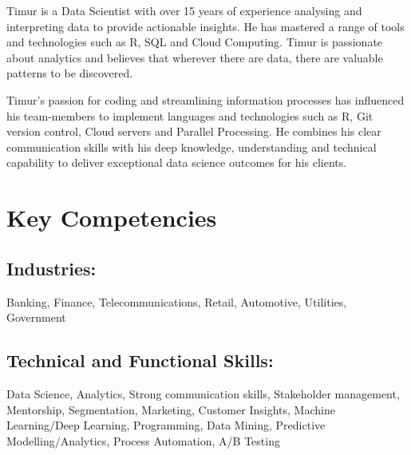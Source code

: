 \documentclass{article}
\begin{document}

\pagestyle{fancy}
\fancyhf{} %



Timur is a Data Scientist with over 15 years of experience analysing and interpreting data to provide actionable insights. He has mastered a range of tools and technologies such as R, SQL and Cloud Computing. Timur is passionate about analytics and believes that wherever there are data, there are valuable patterns to be discovered.

\medskip

\noindent
Timur's passion for coding and streamlining information processes has influenced his team-members to implement languages and technologies such as R, Git version control, Cloud servers and Parallel Processing. He combines his clear communication skills with his deep knowledge, understanding and technical capability to deliver exceptional data science outcomes for his clients.

\section{Key Competencies}
\subsection{Industries:}
Banking, Finance, Telecommunications, Retail, Automotive, Utilities, Government

\subsection{Technical and Functional Skills:}
Data Science, Analytics, Strong communication skills, Stakeholder management, Mentorship, Segmentation, Marketing, Customer Insights, Machine Learning/Deep Learning, Programming, Data Mining, Predictive Modelling/Analytics, Process Automation, A/B Testing
\end{document}
